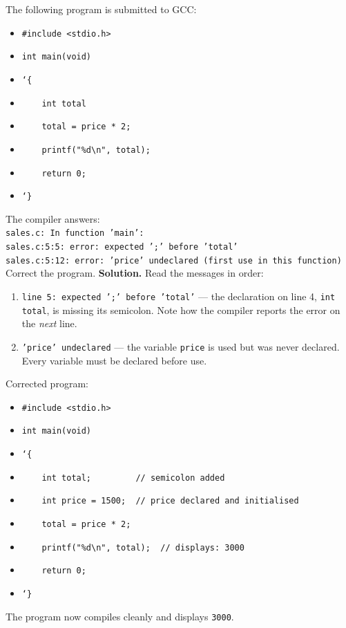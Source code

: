 \documentclass[11pt]{article}
\begin{document}
\begin{exoresolu}
The following program is submitted to GCC:
\begin{itemize}
\item[] \texttt{\#include <stdio.h>}
\item[] \texttt{int main(void)}
\item[] \texttt{\char`\{}
\item[] \texttt{\ \ \ \ int total}
\item[] \texttt{\ \ \ \ total = price * 2;}
\item[] \texttt{\ \ \ \ printf("\%d\textbackslash n", total);}
\item[] \texttt{\ \ \ \ return 0;}
\item[] \texttt{\char`\}}
\end{itemize}
The compiler answers:\\
\texttt{sales.c: In function 'main':}\\
\texttt{sales.c:5:5: error: expected ';' before 'total'}\\
\texttt{sales.c:5:12: error: 'price' undeclared (first use in this function)}\\
Correct the program.
\tcblower
\textbf{Solution.} Read the messages in order:
\begin{enumerate}
\item \texttt{line 5: expected ';' before 'total'} — the declaration on line 4, \texttt{int total}, is missing its semicolon. Note how the compiler reports the error on the \emph{next} line.
\item \texttt{'price' undeclared} — the variable \texttt{price} is used but was never declared. Every variable must be declared before use.
\end{enumerate}
Corrected program:
\begin{itemize}
\item[] \texttt{\#include <stdio.h>}
\item[] \texttt{int main(void)}
\item[] \texttt{\char`\{}
\item[] \texttt{\ \ \ \ int total;\ \ \ \ \ \ \ \ \ // semicolon added}
\item[] \texttt{\ \ \ \ int price = 1500;\ \ // price declared and initialised}
\item[] \texttt{\ \ \ \ total = price * 2;}
\item[] \texttt{\ \ \ \ printf("\%d\textbackslash n", total);\ \ // displays: 3000}
\item[] \texttt{\ \ \ \ return 0;}
\item[] \texttt{\char`\}}
\end{itemize}
The program now compiles cleanly and displays \texttt{3000}.
\end{exoresolu}
\end{document}
